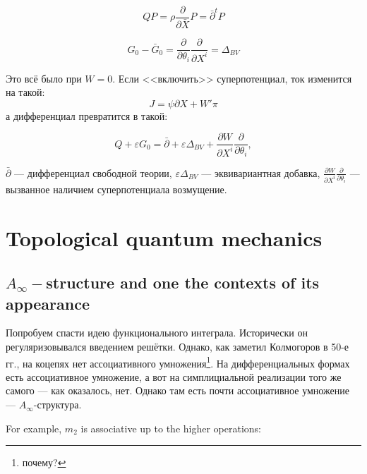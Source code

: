 \documentclass[11pt]{article}
\def\p{\partial}
\theoremstyle{remark}
\theoremstyle{definition}
\newcommand{\que}[1]{\footnote{\textcolor[rgb]{0.38,0.69,0.82}{#1}}}
\begin{document}
$$QP = \rho \frac{\p}{\p \bar X} P = \bar \p^{t} P$$

$$G_0 - \bar G_0 = \frac{\p}{\p \theta_i} \frac{\p}{\p X^i} = \Delta_{BV}$$

Это всё было при $W=0$. Если <<включить>> суперпотенциал, ток изменится на такой: $$J = \psi \p X + W' \pi$$ а дифференциал превратится в такой:

$$Q + \varepsilon G_0 = \bar\p + \varepsilon \Delta_{BV} + \frac{\p W}{\p X^i} \frac{\p}{\p \theta_i},$$

$\bar\p$ --- дифференциал свободной теории, $\varepsilon \Delta_{BV}$ --- эквивариантная добавка, $\frac{\p W}{\p X^i} \frac{\p}{\p \theta_i}$ --- вызванное наличием суперпотенциала возмущение.

\section{Topological quantum mechanics}
\subsection{$A_{\infty}-$structure and one the contexts of its appearance}

Попробуем спасти идею функционального интеграла. Исторически он регуляризовывался введением решётки. Однако, как заметил Колмогоров в 50-е гг.,  на коцепях нет ассоциативного умножения\que{почему?}. На дифференциальных формах есть ассоциативное умножение, а вот на симплициальной реализации того же самого --- как оказалось, нет. Однако там есть почти ассоциативное умножение --- $A_{\infty}$-структура.

For example, $m_2$ is associative up to the higher operations:
\end{document}
